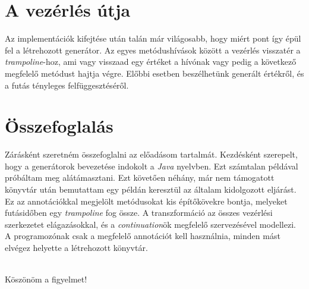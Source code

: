 \documentclass[12pt, a4paper]{article}
\begin{document}
\section{A vezérlés útja}

Az implementációk kifejtése után talán már világosabb, hogy miért pont így épül fel a létrehozott generátor. Az egyes metódushívások között a vezérlés visszatér a \textit{trampoline}-hoz, ami vagy visszaad egy értéket a hívónak vagy pedig a következő megfelelő metódust hajtja végre. Előbbi esetben beszélhetünk generált értékről, és a futás tényleges felfüggesztéséről.

\section{Összefoglalás}

Zárásként szeretném összefoglalni az előadásom tartalmát. Kezdésként szerepelt, hogy a generátorok bevezetése indokolt a \textit{Java} nyelvben. Ezt számtalan példával próbáltam meg alátámasztani. Ezt követően néhány, már nem támogatott könyvtár után bemutattam egy példán keresztül az általam kidolgozott eljárást. Ez az annotációkkal megjelölt metódusokat kis építőkövekre bontja, melyeket futásidőben egy \textit{trampoline} fog össze. A transzformáció az összes vezérlési szerkezetet elágazásokkal, és a \textit{continuation}ök megfelelő szervezésével modellezi. A programozónak csak a megfelelő annotációt kell használnia, minden mást elvégez helyette a létrehozott könyvtár.

\hfill \\

Köszönöm a figyelmet!
\end{document}
